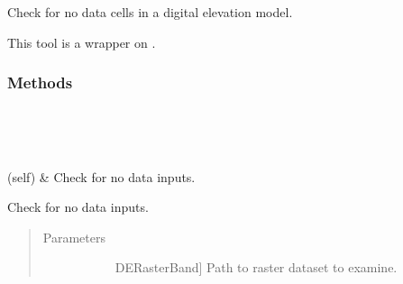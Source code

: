 \documentclass[letterpaper,10pt,english]{sphinxmanual}
\begin{document}
\begin{fulllineitems}
\label{\detokenize{StreamStats_DataPrep:StreamStats_DataPrep.CheckNoData}}
Check for no data cells in a digital elevation model.

This tool is a wrapper on {\hyperref[\detokenize{elevationTools:elevationTools.checkNoData}]{}}.
\subsubsection*{Methods}


\begin{savenotes}\sphinxatlongtablestart\begin{longtable}{}
\hline

\endfirsthead

%
{}\\
\hline

\endhead

\hline
{}\\
\endfoot

\endlastfoot

{\hyperref[\detokenize{StreamStats_DataPrep:StreamStats_DataPrep.CheckNoData.getParameterInfo}]{}}(self)
&
Check for no data inputs.
\\
\hline
\end{longtable}\sphinxatlongtableend\end{savenotes}

\begin{fulllineitems}
\label{\detokenize{StreamStats_DataPrep:StreamStats_DataPrep.CheckNoData.getParameterInfo}}
Check for no data inputs.
\begin{quote}\begin{description}
\item[{Parameters}] \leavevmode\begin{description}
\item[{}] \leavevmode{[}DERasterBand{]}
Path to raster dataset to examine.


\end{description}
\end{description}
\end{quote}
\end{fulllineitems}
\end{fulllineitems}
\end{document}
